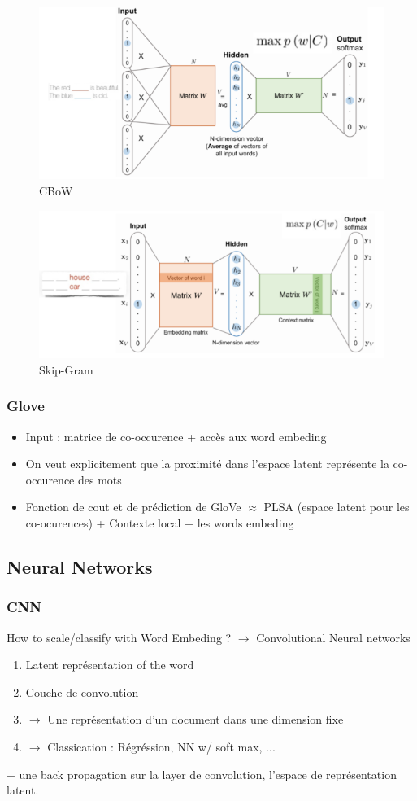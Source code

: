 \documentclass{article}
\theoremstyle{plain}%
\theoremstyle{definition}
\theoremstyle{remark}
\begin{document}
\begin{figure}[htbp]
    \centering
    \includegraphics*[width=.75\textwidth]{CBoW.png}
    \caption{CBoW}
\end{figure}
\begin{figure}[htbp]
    \centering
    \includegraphics*[width=.75\textwidth]{skipgram.png}
    \caption{Skip-Gram}
\end{figure}

\subsubsection{Glove}
\begin{itemize}
    \item Input : matrice de co-occurence + accès aux word embeding
    \item On veut explicitement que la proximité dans l'espace latent représente la co-occurence des mots
    \item Fonction de cout et de prédiction de GloVe $ \approx  $ PLSA (espace latent pour les co-ocurences) + Contexte local + les words embeding 
\end{itemize}

\subsection{Neural Networks}
\subsubsection{CNN}
How to scale/classify with Word Embeding ? $\rightarrow$ Convolutional Neural networks
\begin{enumerate}
    \item Latent représentation of the word 
    \item Couche de convolution
    \item $\rightarrow$ Une représentation d'un document dans une dimension fixe
    \item $\rightarrow$ Classication : Régréssion, NN w/ soft max, ...
\end{enumerate}
+ une back propagation sur la layer de convolution, l'espace de représentation latent. 
\end{document}
